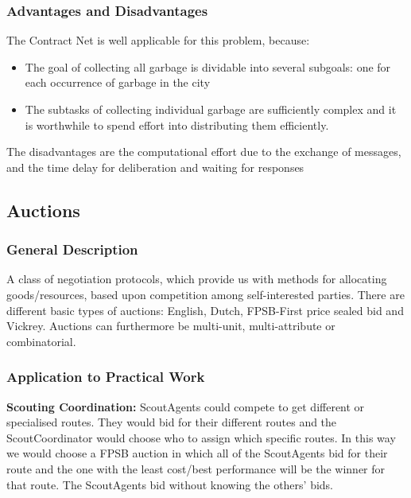 \subsubsection{Advantages and Disadvantages}

The Contract Net is well applicable for this problem, because:

\begin{itemize}
	\item The goal of collecting all garbage is dividable into several subgoals: one for each occurrence of garbage in the city
	\item The subtasks of collecting individual garbage are sufficiently complex and it is worthwhile to spend effort into distributing them efficiently. 
\end{itemize}

The disadvantages are the computational effort due to the exchange of messages, and the time delay for deliberation and waiting for responses 



\subsection{Auctions}

\subsubsection{General Description}

A class of negotiation protocols, which provide us with methods for allocating goods/resources, based upon competition among self-interested parties.
There are different basic types of auctions: English, Dutch, FPSB-First price sealed bid and Vickrey. Auctions can furthermore be multi-unit, multi-attribute or combinatorial.


\subsubsection{Application to Practical Work}

\textbf{Scouting Coordination:} ScoutAgents could compete to get different or specialised routes. They would bid for their different routes and the ScoutCoordinator would choose who to assign which specific routes. In this way we would choose a FPSB auction in which all of the ScoutAgents bid for their route and the one with the least cost/best performance will be the winner for that route. The ScoutAgents bid without knowing the others' bids.


